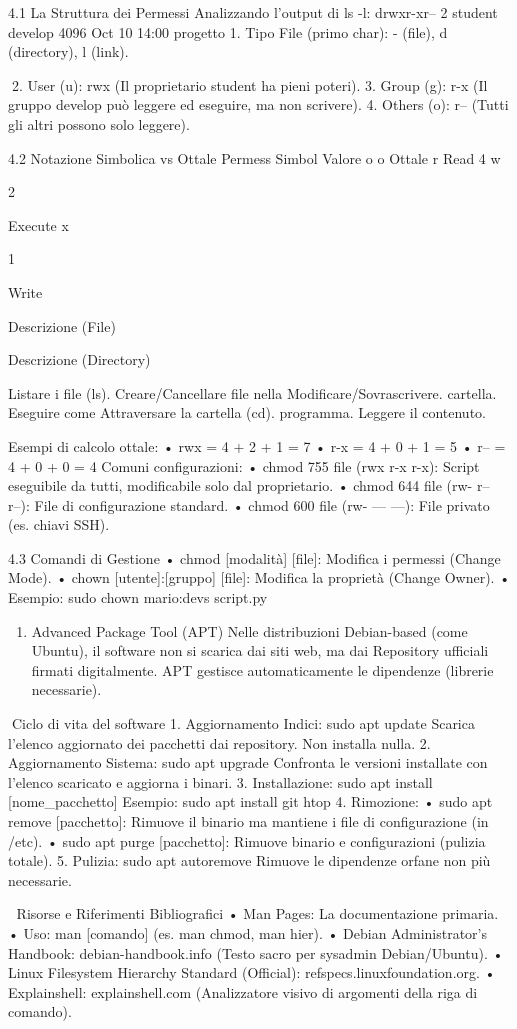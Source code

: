 \documentclass[11pt,a4paper]{article}
\providecommand{\tightlist}{%
  \setlength{\itemsep}{0pt}\setlength{\parskip}{0pt}}
\begin{document}
4.1 La Struttura dei Permessi Analizzando l'output di ls -l: drwxr-xr--
2 student develop 4096 Oct 10 14:00 progetto 1. Tipo File (primo char):
- (file), d (directory), l (link).

2. User (u): rwx (Il proprietario student ha pieni poteri). 3. Group
(g): r-x (Il gruppo develop può leggere ed eseguire, ma non scrivere).
4. Others (o): r-- (Tutti gli altri possono solo leggere).

4.2 Notazione Simbolica vs Ottale Permess Simbol Valore o o Ottale r
Read 4 w

2

Execute x

1

Write

Descrizione (File)

Descrizione (Directory)

Listare i file (ls). Creare/Cancellare file nella
Modificare/Sovrascrivere. cartella. Eseguire come Attraversare la
cartella (cd). programma. Leggere il contenuto.

Esempi di calcolo ottale: • rwx = 4 + 2 + 1 = 7 • r-x = 4 + 0 + 1 = 5 •
r-- = 4 + 0 + 0 = 4 Comuni configurazioni: • chmod 755 file (rwx r-x
r-x): Script eseguibile da tutti, modificabile solo dal proprietario. •
chmod 644 file (rw- r-- r--): File di configurazione standard. • chmod
600 file (rw- --- ---): File privato (es. chiavi SSH).

4.3 Comandi di Gestione • chmod {[}modalità{]} {[}file{]}: Modifica i
permessi (Change Mode). • chown {[}utente{]}:{[}gruppo{]} {[}file{]}:
Modifica la proprietà (Change Owner). • Esempio: sudo chown mario:devs
script.py

\begin{enumerate}
\def\labelenumi{\arabic{enumi}.}
\setcounter{enumi}{4}
\tightlist
\item
  Advanced Package Tool (APT) Nelle distribuzioni Debian-based (come
  Ubuntu), il software non si scarica dai siti web, ma dai Repository
  ufficiali firmati digitalmente. APT gestisce automaticamente le
  dipendenze (librerie necessarie).
\end{enumerate}

Ciclo di vita del software 1. Aggiornamento Indici: sudo apt update
Scarica l'elenco aggiornato dei pacchetti dai repository. Non installa
nulla. 2. Aggiornamento Sistema: sudo apt upgrade Confronta le versioni
installate con l'elenco scaricato e aggiorna i binari. 3. Installazione:
sudo apt install {[}nome\_pacchetto{]} Esempio: sudo apt install git
htop 4. Rimozione: • sudo apt remove {[}pacchetto{]}: Rimuove il binario
ma mantiene i file di configurazione (in /etc). • sudo apt purge
{[}pacchetto{]}: Rimuove binario e configurazioni (pulizia totale). 5.
Pulizia: sudo apt autoremove Rimuove le dipendenze orfane non più
necessarie.

🔗 Risorse e Riferimenti Bibliografici • Man Pages: La documentazione
primaria. • Uso: man {[}comando{]} (es. man chmod, man hier). • Debian
Administrator's Handbook: debian-handbook.info (Testo sacro per sysadmin
Debian/Ubuntu). • Linux Filesystem Hierarchy Standard (Official):
refspecs.linuxfoundation.org. • Explainshell: explainshell.com
(Analizzatore visivo di argomenti della riga di comando).


\end{document}
